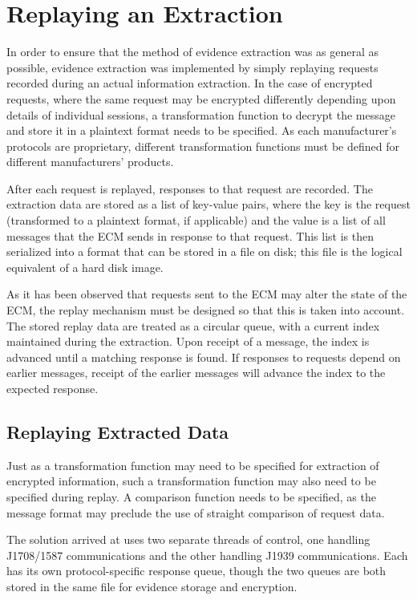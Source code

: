 \section{Replaying an Extraction}

In order to ensure that the method of evidence extraction was as general as possible, evidence extraction was implemented
by simply replaying requests recorded during an actual information extraction. In the case of encrypted requests, where
the same request may be encrypted differently depending upon details of individual sessions, a transformation function
to decrypt the message and store it in a plaintext format needs to be specified. As each manufacturer's protocols
are proprietary, different transformation functions must be defined for different manufacturers' products.

After each request is replayed, responses to that request are recorded. The extraction data are stored as a list of 
key-value pairs, where the key is the request (transformed to a plaintext format, if applicable) and the value is
a list of all messages that the ECM sends in response to that request. This list is then serialized into a format
that can be stored in a file on disk; this file is the logical equivalent of a hard disk image.

As it has been observed that requests sent to the ECM may alter the state of the ECM, the replay mechanism must
be designed so that this is taken into account. The stored replay data are treated as a circular queue, with a current
index maintained during the extraction. Upon receipt of a message, the index is advanced until a matching response is found.
If responses to requests depend on earlier messages, receipt of the earlier messages will advance the index to
the expected response.

\subsection{Replaying Extracted Data}

Just as a transformation function may need to be specified for extraction of encrypted information, such a transformation
function may also need to be specified during replay. A comparison function needs to be specified, as the message format may
preclude the use of straight comparison of request data.

The solution arrived at uses two separate threads of control, one handling J1708/1587 communications and the other
handling J1939 communications. Each has its own protocol-specific response queue, though the two queues are both
stored in the same file for evidence storage and encryption.


